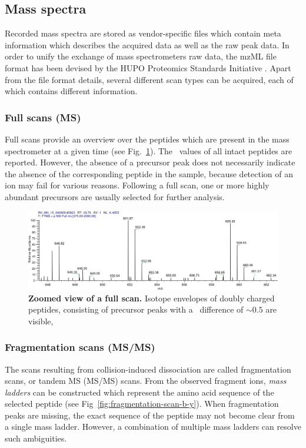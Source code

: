 \subsection{Mass spectra}

Recorded mass spectra are stored as vendor-specific files which contain meta 
information which describes the acquired data as well as the raw peak data.
In order to unify the exchange of mass spectrometers raw data, the mzML file 
format has been devised by the HUPO Proteomics Standards Initiative
\citep{Deutsch2008}.
Apart from the file format details, several different scan types can be
acquired, each of which contains different information.

\subsubsection{Full scans (MS)}

Full scans provide an overview over the peptides which are present in the
mass spectrometer at a given time (see Fig.~\ref{fig:full-scan}).
The \mz~values of all intact peptides are reported.
However, the absence of a precursor peak does not necessarily indicate the
absence of the corresponding peptide in the sample, because detection of
an ion may fail for various reasons.
Following a full scan, one or more highly abundant precursors are usually
selected for further analysis.

\begin{figure}[h]
\includegraphics[width=\textwidth]{figures/ms1-scan.jpg}
\caption{
{\bf Zoomed view of a full scan.}
Isotope envelopes of doubly charged peptides, consisting of precursor
peaks with a \mz~difference of $\sim0.5$ are visible,
}
\label{fig:full-scan}
\end{figure}

\subsubsection{Fragmentation scans (MS/MS)}

The scans resulting from collision-induced dissociation are called 
fragmentation scans, or tandem MS (MS/MS) scans.
From the observed fragment ions, {\em mass ladders} can be constructed which
represent the amino acid sequence of the selected peptide (see Fig~\ref{fig:fragmentation-scan-b-y}). 
When fragmentation peaks are missing, the exact sequence of the peptide may not
become clear from a single mass ladder.
However, a combination of multiple mass ladders can resolve such ambiguities.

